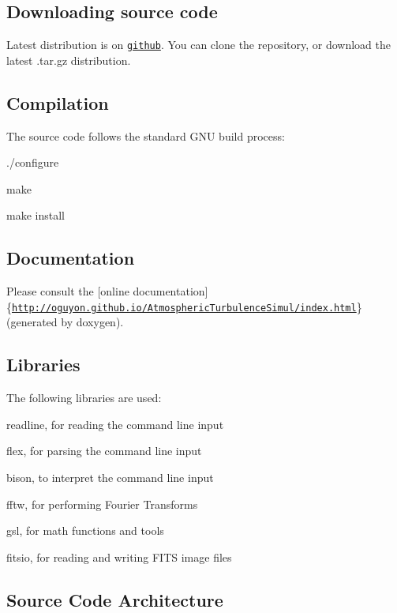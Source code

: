 \subsection*{Downloading source code}

Latest distribution is on \href{https://github.com/oguyon/}{\tt github}. You can clone the repository, or download the latest .tar.\+gz distribution.

\subsection*{Compilation}

The source code follows the standard G\+N\+U build process\+:

./configure

make

make install

\subsection*{Documentation}

Please consult the \mbox{[}online documentation\mbox{]}\{\href{http://oguyon.github.io/AtmosphericTurbulenceSimul/index.html}{\tt http\+://oguyon.\+github.\+io/\+Atmospheric\+Turbulence\+Simul/index.\+html}\} (generated by doxygen).

\subsection*{Libraries}

The following libraries are used\+:
\begin{DoxyItemize}
\item readline, for reading the command line input
\item flex, for parsing the command line input
\item bison, to interpret the command line input
\item fftw, for performing Fourier Transforms
\item gsl, for math functions and tools
\item fitsio, for reading and writing F\+I\+T\+S image files
\end{DoxyItemize}

\subsection*{Source Code Architecture}

